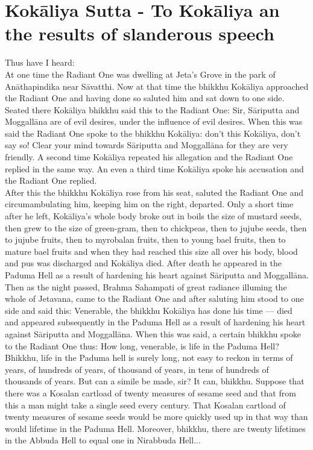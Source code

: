    
\chapter{Kok\=aliya Sutta - To Kok\=aliya an the results of slanderous speech}

Thus have I heard:\\

At one time the Radiant One was dwelling at Jeta's Grove in the park of An\=athapindika near S\=avatthi. Now at that time the bhikkhu Kok\=aliya approached the Radiant One and having done so saluted him and sat down to one side. Seated there Kok\=aliya bhikkhu said this to the Radiant One: Sir, S\=ariputta and Moggall\=ana are of evil desires, under the inﬂuence of evil desires. When this was said the Radiant One spoke to the bhikkhu Kok\=aliya: don't this Kok\=aliya, don't say so! Clear your mind towards S\=ariputta and Moggall\=ana for they are very friendly. A second time Kok\=aliya repeated his allegation and the Radiant One replied in the same way. An even a third time Kok\=aliya spoke his accusation and the Radiant One replied.\\

After this the bhikkhu Kok\=aliya rose from his seat, saluted the Radiant One and circumambulating him, keeping him on the right, departed. Only a short time after he left, Kok\=aliya's whole body broke out in boils the size of mustard seeds, then grew to the size of green-gram, then to chickpeas, then to jujube seeds, then to jujube fruits, then to myrobalan fruits, then to young bael fruits, then to mature bael fruits and when they had reached this size all over his body, blood and pus was discharged and Kok\=aliya died. After death he appeared in the Paduma Hell as a result of hardening his heart against S\=ariputta and Moggall\=ana.\\

Then as the night passed, Brahma Sahampati of great radiance illuming the whole of Jetavana, came to the Radiant One and after saluting him stood to one side and said this: Venerable, the bhikkhu Kok\=aliya has done his time — died and appeared subsequently in the Paduma Hell as a result of hardening his heart against S\=ariputta and Moggall\=ana. When this was said, a certain bhikkhu spoke to the Radiant One thus: How long, venerable, is life in the Paduma Hell? Bhikkhu, life in the Paduma hell is surely long, not easy to reckon in terms of years, of hundreds of years, of thousand of years, in tens of hundreds of thousands of years. But can a simile be made, sir? It can, bhikkhu. Suppose that there was a Kosalan cartload of twenty measures of sesame seed and that from this a man might take a single seed every century. That Kosalan cartload of twenty measures of sesame seeds would be more quickly used up in that way than would lifetime in the Paduma Hell. Moreover, bhikkhu, there are twenty lifetimes in the Abbuda Hell to equal one in Nirabbuda Hell...\\

